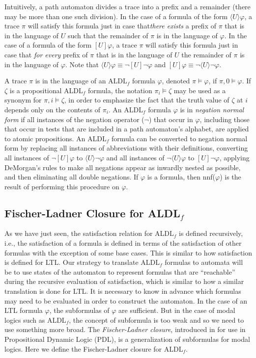 \documentclass{lmcs}
\theoremstyle{definition}
\newcommand{\dbox}[1]{\langle #1 \rangle}
\newcommand{\bbox}[1]{[ #1 ]}
\DeclareMathOperator{\?}{?}
\begin{document}
Intuitively, a path automaton divides a trace into a prefix and a remainder (there may be more than one such division). In the case of a formula of the form $\dbox{U}\varphi$, a trace $\pi$ will satisfy this formula just in case that\textit{there exists} a prefix of $\pi$ that is in the language of $U$ such that the remainder of $\pi$ is in the language of $\varphi$. In the case of a formula of the form $\bbox{U}\varphi$, a trace $\pi$ will satisfy this formula just in case that \textit{for every} prefix of $\pi$ that is in the language of $U$ the remainder of $\pi$ is in the language of $\varphi$. Note that $\dbox{U}\varphi \equiv \neg \bbox{U}\neg \varphi$
and $\bbox{U}\varphi \equiv \neg \dbox{U}\neg\varphi$.

A trace $\pi$ is in the language of an ALDL$_f$ formula $\varphi$, denoted $\pi \models
\varphi$, if $\pi,0 \models \varphi$. If $\zeta$ is a propositional ALDL$_f$ formula, the notation $\pi_i \models \zeta$ may be used as a synonym for $\pi,i \models \zeta$, in order to emphasize the fact that the truth value of $\zeta$ at $i$ depends only on the contents of $\pi_i$. An ALDL$_f$ formula $\varphi$ is in \textit{negation normal form}
if all instances of the negation operator ($\neg$) that occur in $\varphi$, including those that occur in tests that
are included in a path automaton's alphabet, are applied
to atomic propositions. An ALDL$_f$ formula can be converted to negation normal form by replacing all instances of
abbreviations with their definitions, converting all instances of $\neg\bbox{U}\varphi$ to $\dbox{U}\neg\varphi$ and
all instances of $\neg\dbox{U}\varphi$ to $\bbox{U}\neg\varphi$, applying DeMorgan's rules to make all
negations appear as inwardly nested as possible, and then eliminating all double negations. If $\varphi$ is a formula, then nnf($\varphi$) is the result of performing this procedure on $\varphi$.


\subsection{\texorpdfstring{Fischer-Ladner Closure for ALDL$_f$}{Fischer-Ladner Closure for ALDLf}}


As we have just seen, the satisfaction relation for ALDL$_f$ is defined recursively, i.e., the satisfaction of a formula is defined in terms of the satisfaction of other formulas with the exception of some base cases. This is similar to how satisfaction is defined for LTL. Our strategy to translate ALDL$_f$ formulas to automata will be to use states of the automaton to represent formulas that are ``reachable'' during the recursive evaluation of satisfaction, which is similar to how a similar translation is done for LTL. It is necessary to know in advance which formulas may need to be evaluated in order to construct the automaton. In the case of an LTL formula $\varphi$, the subformulas of $\varphi$ are sufficient. But in the case of modal logics such as ALDL$_f$,
the concept of subformula is too weak and so we need to use something more broad. The \textit{Fischer-Ladner closure}, introduced in \cite{fischer79} for use in Propositional Dynamic Logic (PDL), is a generalization of subformulas for modal logics. Here we define the Fischer-Ladner closure for ALDL$_f$.
\end{document}
